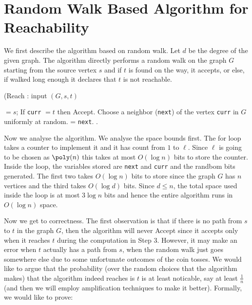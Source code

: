 \section{Random Walk Based Algorithm for Reachability}

We first describe the algorithm based on random walk.  Let $d$ be the degree of the given graph. The algorithm directly performs a random walk on the graph $G$ starting from the source vertex $s$ and if $t$ is found on the way, it accepts, or else, if walked long enough it declares that $t$ is not reachable.

\begin{algorithm}
\label{alg:randomized-reachability-algo}
\caption{({\sc Reach} : input $(G,s,t)$} 
\begin{algorithmic}[1]
 $= s$;
	\State If {\tt curr} $=t$ then {\sc Accept}.
	\State Choose a neighbor ({\tt next}) of the vertex {\tt curr} in $G$ uniformly at random. 
	 = {\tt next}.
\EndFor
{}.
\end{algorithmic}
\end{algorithm}

Now we analyse the algorithm. We analyse the space bounds first. The for loop takes a counter to implement it and it has count from $1$ to $\ell$. Since $\ell$ is going to be chosen as $\poly(n)$ this takes at most $O(\log n)$ bits to store the counter. Inside the loop, the variables stored are {\tt next} and {\tt curr} and the randbom bits generated. The first two takes $O(\log n)$ bits to store since the graph $G$ has $n$ vertices and the third takes $O(\log d)$ bits. Since $d \le n$, the total space used inside the loop is at most $3 \log n$ bits and hence the entire algorithm runs in $O(\log n)$ space.

Now we get to correctness. The first observation is that if there is no path from $s$ to $t$ in the graph $G$, then the algorithm will never {\sc Accept} since it accepts only when it reaches $t$ during the computation in Step 3. However, it may make an error when $t$ actually has a path from $s$, when the random walk just goes somewhere else due to some unfortunate outcomes of the coin tosses. We would like to argue that the probability (over the random choices that the algorithm makes) that the algorithm indeed reaches is $t$ is at least noticable, say at least $\frac{1}{n}$ (and then we will employ amplification techniques to make it better). Formally, we would like to prove:

